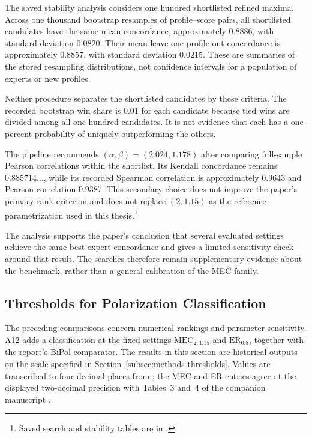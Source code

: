 \documentclass{article}
\theoremstyle{plain}
\theoremstyle{remark}
\begin{document}
The saved stability analysis considers one hundred shortlisted refined maxima. Across one thousand bootstrap resamples of profile--score pairs, all shortlisted candidates have the same mean concordance, approximately $0.8886$, with standard deviation $0.0820$. Their mean leave-one-profile-out concordance is approximately $0.8857$, with standard deviation $0.0215$. These are summaries of the stored resampling distributions, not confidence intervals for a population of experts or new profiles.

Neither procedure separates the shortlisted candidates by these criteria. The recorded bootstrap win share is $0.01$ for each candidate because tied wins are divided among all one hundred candidates. It is not evidence that each has a one-percent probability of uniquely outperforming the others.

The pipeline recommends $(\alpha,\beta)=(2.024,1.178)$ after comparing full-sample Pearson correlations within the shortlist. Its Kendall concordance remains $0.885714\ldots$, while its recorded Spearman correlation is approximately $0.9643$ and Pearson correlation $0.9387$. This secondary choice does not improve the paper's primary rank criterion and does not replace $(2,1.15)$ as the reference parametrization used in this thesis.\footnote{Saved search and stability tables are in .}

The analysis supports the paper's conclusion that several evaluated settings achieve the same best expert concordance and gives a limited sensitivity check around that result. The searches therefore remain supplementary evidence about the benchmark, rather than a general calibration of the MEC family.

\subsection{Thresholds for Polarization Classification}\label{subsec:results-thresholds}

The preceding comparisons concern numerical rankings and parameter sensitivity. A12 adds a classification at the fixed settings $\mathrm{MEC}_{2,1.15}$ and $\mathrm{ER}_{0.8}$, together with the report's BiPol comparator. The results in this section are historical outputs on the scale specified in Section~\ref{subsec:methods-thresholds}. Values are transcribed to four decimal places from \citet{narvaez2025thresholds}; the MEC and ER entries agree at the displayed two-decimal precision with Tables~3 and~4 of the companion manuscript \citep[Section~9.4]{arandaMECthresholds}.
\end{document}
